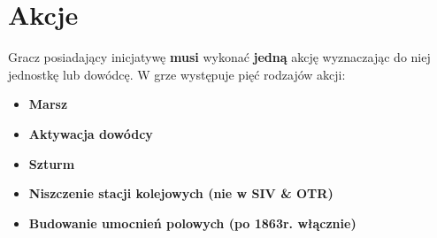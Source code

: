 


\section{Akcje}
Gracz posiadający inicjatywę \textbf{musi} wykonać \textbf{jedną} akcję wyznaczając do niej jednostkę lub dowódcę. W grze występuje pięć rodzajów akcji:
\begin{itemize}
	\item \textbf{Marsz}
	\item \textbf{Aktywacja dowódcy}
	\item \textbf{Szturm}
	\item \textbf{Niszczenie stacji kolejowych (nie w SIV \& OTR)}
	\item \textbf{Budowanie umocnień polowych (po 1863r. włącznie)}
\end{itemize}
